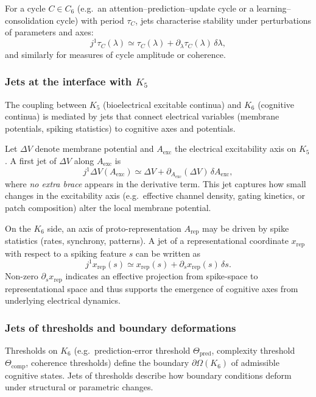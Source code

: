 For a cycle $C \in C_6$ (e.g.\ an attention--prediction--update
cycle or a learning–consolidation cycle) with period $\tau_C$,
jets characterise stability under perturbations of parameters
and axes:
\[
  j^1 \tau_C(\lambda)
  \simeq \tau_C(\lambda)
        + \partial_{\lambda}\tau_C(\lambda)\,\delta\lambda,
\]
and similarly for measures of cycle amplitude or coherence.


\subsubsection{Jets at the interface with \texorpdfstring{$K_5$}{K5}}

The coupling between $K_5$ (bioelectrical excitable continua)
and $K_6$ (cognitive continua) is mediated by jets that connect
electrical variables (membrane potentials, spiking statistics)
to cognitive axes and potentials.

Let $\Delta V$ denote membrane potential and
$A_{\mathrm{exc}}$ the electrical excitability axis on $K_5$.
A first jet of $\Delta V$ along $A_{\mathrm{exc}}$ is
\[
  j^1 \Delta V(A_{\mathrm{exc}})
  \simeq \Delta V
        + \partial_{A_{\mathrm{exc}}}(\Delta V)\,\delta A_{\mathrm{exc}},
\]
where \emph{no extra brace} appears in the derivative term.
This jet captures how small changes in the excitability axis
(e.g.\ effective channel density, gating kinetics, or patch
composition) alter the local membrane potential.

On the $K_6$ side, an axis of proto-representation $A_{\mathrm{rep}}$
may be driven by spike statistics (rates, synchrony, patterns).
A jet of a representational coordinate $x_{\mathrm{rep}}$ with
respect to a spiking feature $s$ can be written as
\[
  j^1 x_{\mathrm{rep}}(s)
  \simeq x_{\mathrm{rep}}(s)
        + \partial_s x_{\mathrm{rep}}(s)\,\delta s.
\]
Non-zero $\partial_s x_{\mathrm{rep}}$ indicates an effective
projection from spike-space to representational space and thus
supports the emergence of cognitive axes from underlying
electrical dynamics.


\subsubsection{Jets of thresholds and boundary deformations}

Thresholds on $K_6$ (e.g.\ prediction-error threshold
$\Theta_{\mathrm{pred}}$, complexity threshold
$\Theta_{\mathrm{comp}}$, coherence thresholds) define the
boundary $\partial\Omega(K_6)$ of admissible cognitive states.
Jets of thresholds describe how boundary conditions deform
under structural or parametric changes.

